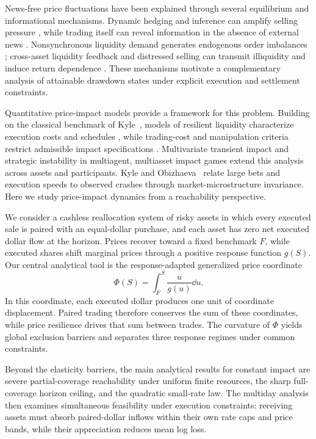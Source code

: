 \documentclass[review,hidelinks,onefignum,onetabnum]{siamonline250211}
\begin{document}
News-free price fluctuations have been explained through several equilibrium and informational mechanisms. Dynamic hedging and inference can amplify selling pressure \citep{GennotteLeland1990}, while trading itself can reveal information in the absence of external news \citep{Romer1993}. Nonsynchronous liquidity demand generates endogenous order imbalances \citep{HuangWang2009}; cross-asset liquidity feedback and distressed selling can transmit illiquidity and induce return dependence \citep{CespaFoucault2014,ContWagalath2013}. These mechanisms motivate a complementary analysis of attainable drawdown states under explicit execution and settlement constraints.

Quantitative price-impact models provide a framework for this problem. Building on the classical benchmark of Kyle~\citep{Kyle1985}, models of resilient liquidity characterize execution costs and schedules \citep{ObizhaevaWang2013,AlfonsiSchied2010}, while trading-cost and manipulation criteria restrict admissible impact specifications \citep{Gatheral2010,AlfonsiSchiedSlynko2012,HubermanStanzl2004}. Multivariate transient impact \citep{AlfonsiKlockSchied2016} and strategic instability in multiagent, multiasset impact games \citep{CordoniLillo2024} extend this analysis across assets and participants. Kyle and Obizhaeva~\citep{KyleObizhaeva2023} relate large bets and execution speeds to observed crashes through market-microstructure invariance. Here we study price-impact dynamics from a reachability perspective.

We consider a cashless reallocation system of risky assets in which every executed sale is paired with an equal-dollar purchase, and each asset has zero net executed dollar flow at the horizon. Prices recover toward a fixed benchmark $F$, while executed shares shift marginal prices through a positive response function $g(S)$. Our central analytical tool is the response-adapted generalized price coordinate
\begin{equation}\label{eq:phi-intro}
\Phi(S)=\int_F^S\frac{u}{g(u)}\dd u.
\end{equation}
In this coordinate, each executed dollar produces one unit of coordinate displacement. Paired trading therefore conserves the sum of these coordinates, while price resilience drives that sum between trades. The curvature of $\Phi$ yields global exclusion barriers and separates three response regimes under common constraints.

Beyond the elasticity barriers, the main analytical results for constant impact are severe partial-coverage reachability under uniform finite resources, the sharp full-coverage horizon ceiling, and the quadratic small-rate law. The multiday analysis then examines simultaneous feasibility under execution constraints: receiving assets must absorb paired-dollar inflows within their own rate caps and price bands, while their appreciation reduces mean log loss.
\end{document}
